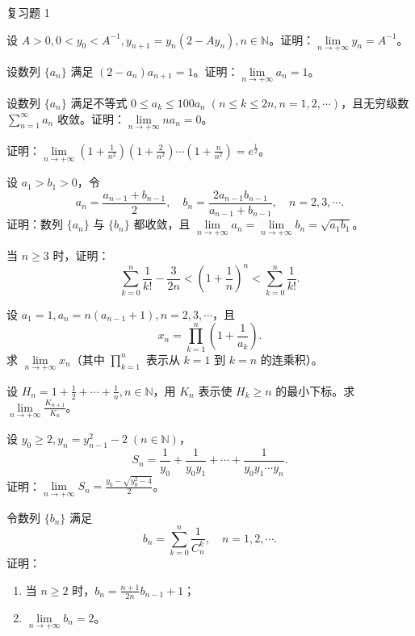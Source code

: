 \begin{exblock}{复习题 1}
    \item 设 $A > 0, 0 < y_0 < A^{-1}, y_{n+1} = y_n(2 - A y_n), n \in \mathbb{N}$。证明：$\lim\limits_{n\to+\infty} y_n = A^{-1}$。

    \item 设数列 $\{a_n\}$ 满足 $(2 - a_n)a_{n+1} = 1$。证明：$\lim\limits_{n\to+\infty} a_n = 1$。

    \item 设数列 $\{a_n\}$ 满足不等式 $0 \leqslant a_k \leqslant 100 a_n\; (n \leqslant k \leqslant 2n, n = 1, 2, \cdots)$，且无穷级数 $\sum\limits_{n=1}^\infty a_n$ 收敛。证明：$\lim\limits_{n\to+\infty} n a_n = 0$。

    \item 证明：$\lim\limits_{n\to+\infty} \left(1 + \frac{1}{n^2}\right)\left(1 + \frac{2}{n^2}\right)\cdots\left(1 + \frac{n}{n^2}\right) = e^{\frac{1}{2}}$。

    \item 设 $a_1 > b_1 > 0$，令
    \[
    a_n = \frac{a_{n-1} + b_{n-1}}{2},\quad b_n = \frac{2a_{n-1} b_{n-1}}{a_{n-1} + b_{n-1}},\quad n = 2, 3, \cdots.
\]
    证明：数列 $\{a_n\}$ 与 $\{b_n\}$ 都收敛，且 $\lim\limits_{n\to+\infty} a_n = \lim\limits_{n\to+\infty} b_n = \sqrt{a_1 b_1}$。

    \item 当 $n \geqslant 3$ 时，证明：
    \[
    \sum_{k=0}^n \frac{1}{k!} - \frac{3}{2n} < \left(1 + \frac{1}{n}\right)^n < \sum_{k=0}^n \frac{1}{k!}.
\]

    \item 设 $a_1 = 1, a_n = n(a_{n-1} + 1), n = 2, 3, \cdots$，且
    \[
    x_n = \prod_{k=1}^n \left(1 + \frac{1}{a_k}\right).
\]
    求 $\lim\limits_{n\to+\infty} x_n$（其中 $\prod\limits_{k=1}^n$ 表示从 $k=1$ 到 $k=n$ 的连乘积）。

    \item 设 $H_n = 1 + \frac{1}{2} + \cdots + \frac{1}{n}, n \in \mathbb{N}$，用 $K_n$ 表示使 $H_k \geqslant n$ 的最小下标。求 $\lim\limits_{n\to+\infty} \frac{K_{n+1}}{K_n}$。

    \item 设 $y_0 \geqslant 2, y_n = y_{n-1}^2 - 2\; (n \in \mathbb{N})$，
    \[
    S_n = \frac{1}{y_0} + \frac{1}{y_0 y_1} + \cdots + \frac{1}{y_0 y_1 \cdots y_n}.
\]
    证明：$\lim\limits_{n\to+\infty} S_n = \frac{y_0 - \sqrt{y_0^2 - 4}}{2}$。

    \item 令数列 $\{b_n\}$ 满足
    \[
    b_n = \sum_{k=0}^n \frac{1}{C_n^k},\quad n = 1, 2, \cdots.
\]
    证明：
    \begin{enumerate}
        \item 当 $n \geqslant 2$ 时，$b_n = \frac{n+1}{2n} b_{n-1} + 1$；
        \item $\lim\limits_{n\to+\infty} b_n = 2$。
    \end{enumerate}


\end{exblock}
